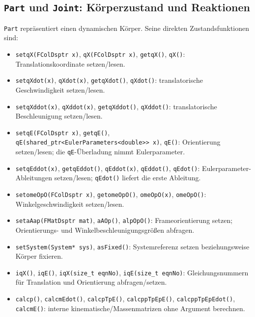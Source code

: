 \documentclass[
  12pt
]{book}
\providecommand{\tightlist}{%
  \setlength{\itemsep}{0pt}\setlength{\parskip}{0pt}}
\begin{document}
\hypertarget{part-und-joint-kuxf6rperzustand-und-reaktionen}{%
\subsection*{\texorpdfstring{\texttt{Part} und \texttt{Joint}:
Körperzustand und
Reaktionen}{Part und Joint: Körperzustand und Reaktionen}}\label{part-und-joint-kuxf6rperzustand-und-reaktionen}}

\texttt{Part} repräsentiert einen dynamischen Körper. Seine direkten
Zustandsfunktionen sind:

\begin{itemize}
\tightlist
\item
  \texttt{setqX(FColDsptr\ x)}, \texttt{qX(FColDsptr\ x)},
  \texttt{getqX()}, \texttt{qX()}: Translationskoordinate setzen/lesen.
\item
  \texttt{setqXdot(x)}, \texttt{qXdot(x)}, \texttt{getqXdot()},
  \texttt{qXdot()}: translatorische Geschwindigkeit setzen/lesen.
\item
  \texttt{setqXddot(x)}, \texttt{qXddot(x)}, \texttt{getqXddot()},
  \texttt{qXddot()}: translatorische Beschleunigung setzen/lesen.
\item
  \texttt{setqE(FColDsptr\ x)}, \texttt{getqE()},
  \texttt{qE(shared\_ptr\textless{}EulerParameters\textless{}double\textgreater{}\textgreater{}\ x)},
  \texttt{qE()}: Orientierung setzen/lesen; die \texttt{qE}-Überladung
  nimmt Eulerparameter.
\item
  \texttt{setqEddot(x)}, \texttt{getqEddot()}, \texttt{qEddot(x)},
  \texttt{qEddot()}, \texttt{qEdot()}: Eulerparameter-Ableitungen
  setzen/lesen; \texttt{qEdot()} liefert die erste Ableitung.
\item
  \texttt{setomeOpO(FColDsptr\ x)}, \texttt{getomeOpO()},
  \texttt{omeOpO(x)}, \texttt{omeOpO()}: Winkelgeschwindigkeit
  setzen/lesen.
\item
  \texttt{setaAap(FMatDsptr\ mat)}, \texttt{aAOp()}, \texttt{alpOpO()}:
  Frameorientierung setzen; Orientierungs- und
  Winkelbeschleunigungsgrößen abfragen.
\item
  \texttt{setSystem(System*\ sys)}, \texttt{asFixed()}: Systemreferenz
  setzen beziehungsweise Körper fixieren.
\item
  \texttt{iqX()}, \texttt{iqE()}, \texttt{iqX(size\_t\ eqnNo)},
  \texttt{iqE(size\_t\ eqnNo)}: Gleichungsnummern für Translation und
  Orientierung abfragen/setzen.
\item
  \texttt{calcp()}, \texttt{calcmEdot()}, \texttt{calcpTpE()},
  \texttt{calcppTpEpE()}, \texttt{calcppTpEpEdot()}, \texttt{calcmE()}:
  interne kinematische/Massenmatrizen ohne Argument berechnen.
\end{itemize}
\end{document}
